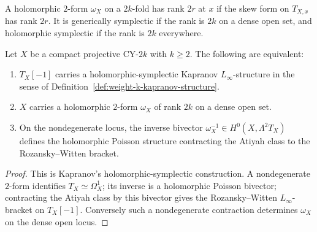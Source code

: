 \begin{definition}
\label{def:genericity-sigma-X-rank}
%
A holomorphic \(2\)-form \(\omega_X\) on a \(2k\)-fold has rank \(2r\) at
\(x\) if the skew form on \(T_{X,x}\) has rank \(2r\). It is generically
symplectic if the rank is \(2k\) on a dense open set, and holomorphic
symplectic if the rank is \(2k\) everywhere.
\end{definition}

\begin{theorem}
\label{thm:weight-k-kapranov-obstruction}
%
Let \(X\) be a compact projective CY-\(2k\) with \(k\ge2\). The following
are equivalent:
\begin{enumerate}[label=\textup{(}\roman*\textup{)}]
 \item \(T_X[-1]\) carries a holomorphic-symplectic Kapranov
 \(L_\infty\)-structure in the sense of
 Definition~\ref{def:weight-k-kapranov-structure}.
 \item \(X\) carries a holomorphic \(2\)-form \(\omega_X\) of rank \(2k\)
 on a dense open set.
 \item On the nondegenerate locus, the inverse bivector
 \(\omega_X^{-1}\in H^0(X,\Lambda^2T_X)\) defines the holomorphic Poisson
 structure contracting the Atiyah class to the Rozansky--Witten bracket.
\end{enumerate}
\end{theorem}

\begin{proof}
This is Kapranov's holomorphic-symplectic construction. A nondegenerate
\(2\)-form identifies \(T_X\simeq\Omega_X^1\); its inverse is a holomorphic
Poisson bivector; contracting the Atiyah class by this bivector gives the
Rozansky--Witten \(L_\infty\)-bracket on \(T_X[-1]\). Conversely such a
nondegenerate contraction determines \(\omega_X\) on the dense open locus.
\end{proof}

